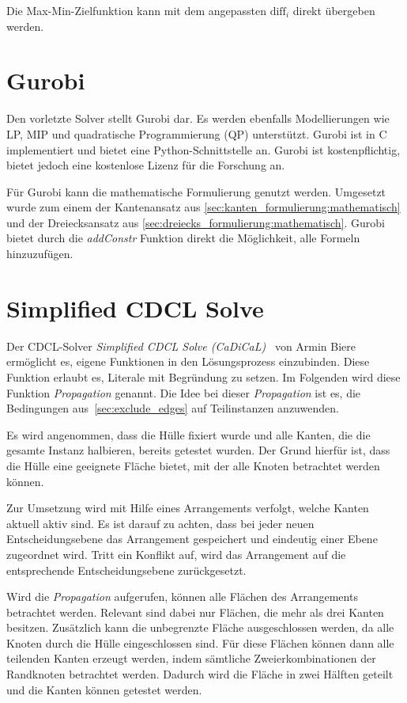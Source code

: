 Die Max-Min-Zielfunktion kann mit dem angepassten \(\text{diff}_i\) direkt übergeben werden.





\section{Gurobi}
Den vorletzte Solver stellt Gurobi dar.
Es werden ebenfalls Modellierungen wie LP, MIP und quadratische Programmierung (QP) unterstützt.
Gurobi ist in C implementiert und bietet eine Python-Schnittstelle an.
Gurobi ist kostenpflichtig, bietet jedoch eine kostenlose Lizenz für die Forschung an.

Für Gurobi kann die mathematische Formulierung genutzt werden.
Umgesetzt wurde zum einem der Kantenansatz aus \cref{sec:kanten_formulierung:mathematisch} und der Dreiecksansatz aus \cref{sec:dreiecks_formulierung:mathematisch}.
Gurobi bietet durch die \emph{addConstr} Funktion direkt die Möglichkeit, alle Formeln hinzuzufügen.

\section{Simplified CDCL Solve}
\label{sec:cdcl:implementiert}
Der CDCL-Solver \emph{Simplified CDCL Solve (CaDiCaL)}~\cite{cadical} von Armin Biere ermöglicht es, eigene Funktionen in den Lösungsprozess einzubinden.
Diese Funktion erlaubt es, Literale mit Begründung zu setzen.
Im Folgenden wird diese Funktion \emph{Propagation} genannt.
Die Idee bei dieser \emph{Propagation} ist es, die Bedingungen aus~\cref{sec:exclude_edges} auf Teilinstanzen anzuwenden.

Es wird angenommen, dass die Hülle fixiert wurde und alle Kanten, die die gesamte Instanz halbieren, bereits getestet wurden.
Der Grund hierfür ist, dass die Hülle eine geeignete Fläche bietet, mit der alle Knoten betrachtet werden können.

Zur Umsetzung wird mit Hilfe eines Arrangements verfolgt, welche Kanten aktuell aktiv sind.
Es ist darauf zu achten, dass bei jeder neuen Entscheidungsebene das Arrangement gespeichert und eindeutig einer Ebene zugeordnet wird.
Tritt ein Konflikt auf, wird das Arrangement auf die entsprechende Entscheidungsebene zurückgesetzt.

Wird die \emph{Propagation} aufgerufen, können alle Flächen des Arrangements betrachtet werden.
Relevant sind dabei nur Flächen, die mehr als drei Kanten besitzen.
Zusätzlich kann die unbegrenzte Fläche ausgeschlossen werden, da alle Knoten durch die Hülle eingeschlossen sind.
Für diese Flächen können dann alle teilenden Kanten erzeugt werden, indem sämtliche Zweierkombinationen der Randknoten betrachtet werden.
Dadurch wird die Fläche in zwei Hälften geteilt und die Kanten können getestet werden.

